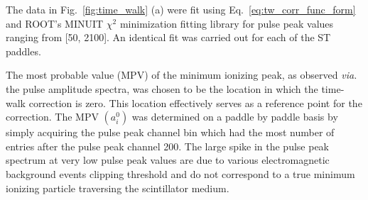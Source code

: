The data in Fig.~\ref{fig:time_walk} (a) were fit using Eq.~\ref{eq:tw_corr_func_form} and ROOT's MINUIT $\chi^{2}$ minimization fitting library \cite{root_minuit} for pulse peak values ranging from [50, 2100].  An identical fit was carried out for each of the ST paddles.


The most probable value (MPV) of the minimum ionizing peak, as observed \textit{via.} the pulse amplitude spectra, was chosen to be the location in which the time-walk correction is zero.  This location effectively serves as a reference point for the correction.  
The MPV $(a^{0}_{i})$ was determined on a paddle by paddle basis by simply acquiring the pulse peak channel bin which had the most number of entries after the pulse peak channel 200.  The large spike in the pulse peak spectrum at very low pulse peak values are due to various electromagnetic background events clipping threshold and do not correspond to a true minimum ionizing particle traversing the scintillator medium.

